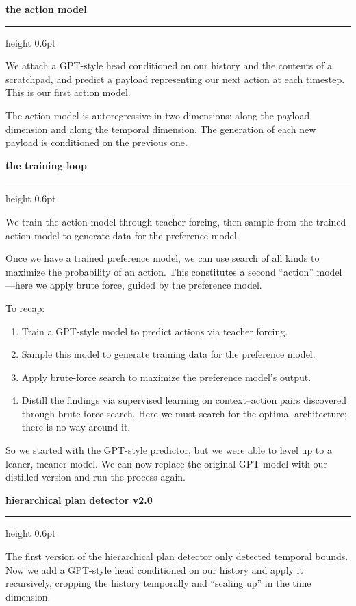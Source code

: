 \documentclass[10pt, a4paper]{article}
\newcommand{\cvsection}[1]{%
  \bigskip
  {\Large\bfseries\color{awesome}\MakeLowercase{#1}}%
  \par\vspace{2pt}%
  {\color{lighttext}\hrule height 0.6pt}%
  \medskip
}
\begin{document}
\cvsection{The Action Model}

We attach a GPT-style head conditioned on our history and the contents of a scratchpad, and predict a payload representing our next action at each timestep. This is our first action model.

The action model is autoregressive in two dimensions: along the payload dimension and along the temporal dimension. The generation of each new payload is conditioned on the previous one.

\cvsection{The Training Loop}

We train the action model through teacher forcing, then sample from the trained action model to generate data for the preference model.

Once we have a trained preference model, we can use search of all kinds to maximize the probability of an action. This constitutes a second ``action'' model---here we apply brute force, guided by the preference model.

To recap:

\begin{enumerate}
  \item Train a GPT-style model to predict actions via teacher forcing.
  \item Sample this model to generate training data for the preference model.
  \item Apply brute-force search to maximize the preference model's output.
  \item Distill the findings via supervised learning on context--action pairs discovered through brute-force search. Here we must search for the optimal architecture; there is no way around it.
\end{enumerate}

So we started with the GPT-style predictor, but we were able to level up to a leaner, meaner model. We can now replace the original GPT model with our distilled version and run the process again.

\cvsection{Hierarchical Plan Detector v2.0}

The first version of the hierarchical plan detector only detected temporal bounds. Now we add a GPT-style head conditioned on our history and apply it recursively, cropping the history temporally and ``scaling up'' in the time dimension.
\end{document}
